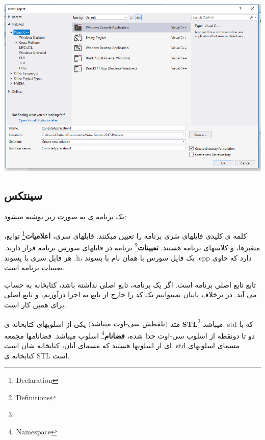 \documentclass[14pt,a4paper]{memoir}
\begin{document}
	 \begin{center}
	 	\includegraphics[scale=0.4]{VSNewProject}
	 \end{center}
	 
	 \subsection{سینتکس}\label{cppsyn}
	 
	 یک برنامه ی  به صورت زیر نوشته میشود:
	 
	 	 	 	 \begin{latin}
	 	
	 \end{latin}
	 
	 کلمه ی کلیدی  فایلهای سَری برنامه را تعیین میکنند. فایلهای سری، \textbf{اعلامیات}\footnote{Declaration} توابع، متغیرها، و کلاسهای برنامه هستند. \textbf{تعیینات}\footnote{Definitions} برنامه در فایلهای سورس برنامه قرار دارند. هر فایل سری با پسوند .h، یک فایل سورس با همان نام با پسوند .cpp دارد که حاوی تعیینات برنامه است. 
	 
	 تابع  تابع اصلی برنامه است. اگر یک برنامه، تابع اصلی نداشته باشد، کتابخانه به حساب می آید. در  برخلاف پایتان نمیتوانیم یک کد را خارج از تابع به اجرا درآوریم، و تابع اصلی برای همین کار است. 
	 
	 متد  $ \text{(تلفظش سی-اوت میباشد)} $ یکی از اسلوبهای کتابخانه ی \textbf{STL}\footnote{} میباشد. std که با دو تا دونقطه از اسلوب سی-اوت جدا شده، \textbf{فضانام}\footnote{Namespace} اسلوب میباشد.  فضانامها مجمعه ای از اسلوبها هستند که مسمای آنان، کتابخانه شان است. std مسمای اسلوبهای کتابخانه ی STL است.
	 
\end{document}

